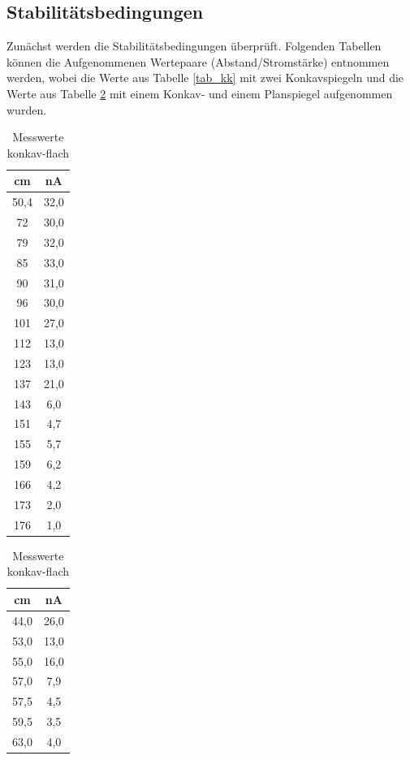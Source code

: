 \subsection{Stabilitätsbedingungen}
Zunächst werden die Stabilitätsbedingungen überprüft. Folgenden Tabellen können die Aufgenommenen Wertepaare (Abstand/Stromstärke) entnommen werden, wobei die Werte aus Tabelle \ref{tab_kk} mit zwei Konkavspiegeln und die Werte aus Tabelle \ref{tab_kf} mit einem Konkav- und einem Planspiegel aufgenommen wurden.
\begin{table}[htbp]
	\begin{minipage}[t]{0.45\textwidth} 
	\begin{tabular}[t]{c|c}
	cm & nA\\ \hline
	50,4 &   32,0\\
 	72    &  30,0\\
 	79     & 32,0\\
 	85      &33,0\\
 	90      &31,0\\
 	96      &30,0\\
 	101     &27,0\\
 	112     &13,0\\
 	123     &13,0\\
 	137     &21,0\\
 	143     &6,0\\
 	151     &4,7\\
 	155     &5,7\\
 	159     &6,2\\
 	166     &4,2\\
 	173     &2,0\\
 	176     &1,0
	\end{tabular}
	\caption{Messwerte konkav-konkav}
	\label{tab_kk}
	\end{minipage}
	\begin{minipage}[t]{0.45\textwidth} 
	\begin{tabular}[t]{c|c}
	cm & nA\\ \hline
	44,0&    26,0\\
	53,0&    13,0\\
	55,0&    16,0\\
	57,0&    7,9\\
	57,5&    4,5\\
	59,5&    3,5\\
	63,0&    4,0
	\end{tabular}
	\caption{Messwerte konkav-flach}
	\label{tab_kf}
	\end{minipage}
\end{table}

